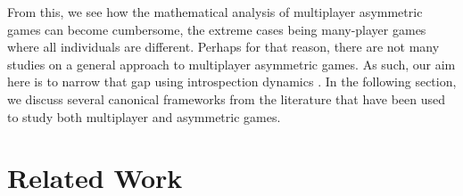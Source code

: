 \documentclass[11pt]{article}
\theoremstyle{plainCl1}
\theoremstyle{plainCl2}
\begin{document}
\noindent From this, we see how the mathematical analysis of multiplayer asymmetric games can become cumbersome, the extreme cases being many-player games where all individuals are different. Perhaps for that reason, there are not many studies on a general approach to multiplayer asymmetric games. As such, our aim here is to narrow that gap using introspection dynamics \cite{Couto:NJP:2022}. In the following section, we discuss several canonical frameworks from the literature that have been used to study both multiplayer and asymmetric games.%


\section*{Related Work}

\end{document}
